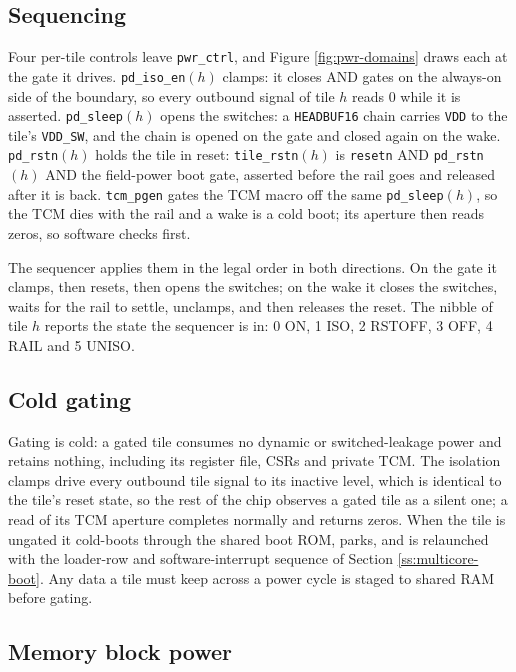\subsection{Sequencing}

Four per-tile controls leave \texttt{pwr\_ctrl}, and Figure \ref{fig:pwr-domains} draws each at the gate it drives. \texttt{pd\_iso\_en}$(h)$ clamps: it closes AND gates on the always-on side of the boundary, so every outbound signal of tile $h$ reads 0 while it is asserted. \texttt{pd\_sleep}$(h)$ opens the switches: a \texttt{HEADBUF16} chain carries \texttt{VDD} to the tile's \texttt{VDD\_SW}, and the chain is opened on the gate and closed again on the wake. \texttt{pd\_rstn}$(h)$ holds the tile in reset: \texttt{tile\_rstn}$(h)$ is \texttt{resetn} AND \texttt{pd\_rstn}$(h)$ AND the field-power boot gate, asserted before the rail goes and released after it is back. \texttt{tcm\_pgen} gates the TCM macro off the same \texttt{pd\_sleep}$(h)$, so the TCM dies with the rail and a wake is a cold boot; its aperture then reads zeros, so software checks  first.

The sequencer applies them in the legal order in both directions. On the gate it clamps, then resets, then opens the switches; on the wake it closes the switches, waits for the rail to settle, unclamps, and then releases the reset. The  nibble of tile $h$ reports the state the sequencer is in: 0 ON, 1 ISO, 2 RSTOFF, 3 OFF, 4 RAIL and 5 UNISO.

\subsection{Cold gating}

Gating is cold: a gated tile consumes no dynamic or switched-leakage power and retains nothing, including its register file, CSRs and private TCM. The isolation clamps drive every outbound tile signal to its inactive level, which is identical to the tile's reset state, so the rest of the chip observes a gated tile as a silent one; a read of its TCM aperture completes normally and returns zeros. When the tile is ungated it cold-boots through the shared boot ROM, parks, and is relaunched with the loader-row and software-interrupt sequence of Section \ref{ss:multicore-boot}. Any data a tile must keep across a power cycle is staged to shared RAM before gating.

\subsection{Memory block power}

